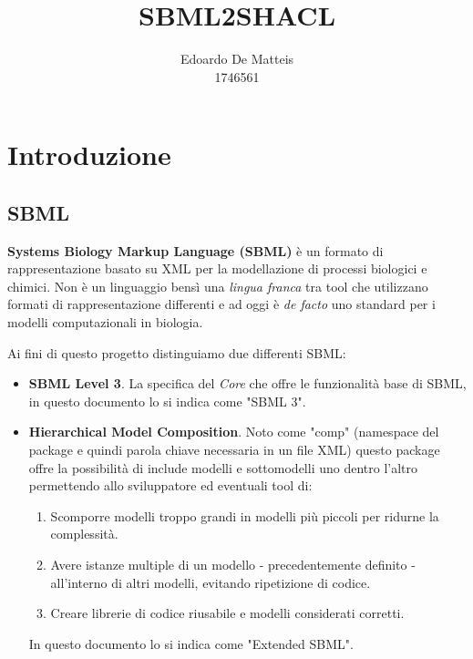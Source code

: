 \documentclass{article}
\title{SBML2SHACL}
\author{Edoardo De Matteis \\ 1746561}
\begin{document}
\maketitle
\tableofcontents

\clearpage

\section{Introduzione}

\subsection{SBML}
\textbf{Systems Biology Markup Language (SBML)} è un formato di rappresentazione basato su XML per la modellazione di processi biologici e chimici. Non è un linguaggio bensì una \textit{lingua franca} tra tool che utilizzano formati di rappresentazione differenti e ad oggi è \textit{de facto} uno standard per i modelli computazionali in biologia. 

Ai fini di questo progetto distinguiamo due differenti SBML:
\begin{itemize}
    \item \textbf{SBML Level 3}. La specifica del \textit{Core} che offre le funzionalità base di SBML, in questo documento lo si indica come "SBML 3".
    \item \textbf{Hierarchical Model Composition}. Noto come "comp" (namespace del package e quindi parola chiave necessaria in un file XML) questo package offre la possibilità di include modelli e sottomodelli uno dentro l'altro permettendo allo sviluppatore ed eventuali tool di:
    \begin{enumerate}
        \item Scomporre modelli troppo grandi in modelli più piccoli per ridurne la complessità.
        \item Avere istanze multiple di un modello - precedentemente definito - all'interno di altri modelli, evitando ripetizione di codice. 
        \item Creare librerie di codice riusabile e modelli considerati corretti. 
    \end{enumerate}
    In questo documento lo si indica come "Extended SBML". 
\end{itemize}
\end{document}
